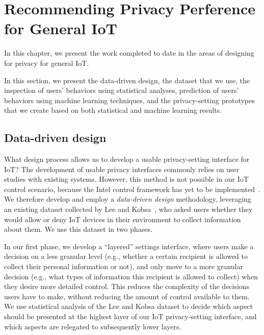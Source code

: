 \chapter{Recommending Privacy Perference for General IoT}
In this chapter, we present the work completed to date in the areas of designing for privacy for general IoT.

In this section, we present the data-driven design, the dataset that we use, the inspection of users' behaviors using statistical analyses, prediction of users' behaviors using machine learning techniques, and the privacy-setting prototypes that we create based on both statistical and machine learning results.

\section{Data-driven design}
What design process allows us to develop a usable privacy-setting interface for IoT? The development of usable privacy interfaces commonly relies on user studies with existing systems. However, this method is not possible in our IoT control scenario, because the Intel control framework has yet to be implemented~\cite{chow2015hci}. We therefore develop and employ a \emph{data-driven design} methodology, leveraging an existing dataset collected by Lee and Kobsa~\cite{lee2016understanding}, who asked users whether they would allow or deny IoT devices in their environment to collect information about them. We use this dataset in two phases. 

In our first phase, we develop a ``layered'' settings interface, where users make a decision on a less granular level (e.g., whether a certain recipient is allowed to collect their personal information or not), and only move to a more granular decision (e.g., what types of information this recipient is allowed to collect) when they desire more detailed control. This reduces the complexity of the decisions users have to make, without reducing the amount of control available to them. We use statistical analysis of the Lee and Kobsa dataset to decide which aspect should be presented at the highest layer of our IoT privacy-setting interface, and which aspects are relegated to subsequently lower layers.

